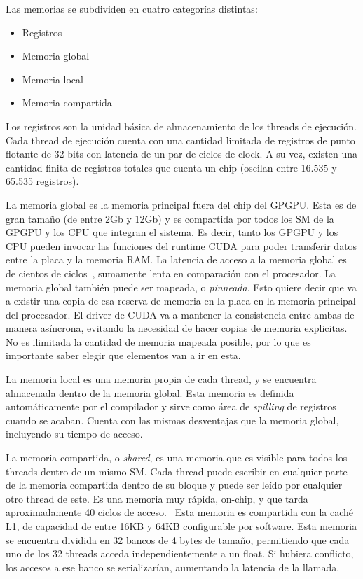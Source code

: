 Las memorias se subdividen en cuatro categor\'ias distintas:

\begin{itemize}
  \item Registros
  \item Memoria global
  \item Memoria local
  \item Memoria compartida
\end{itemize}

Los registros son la unidad b\'asica de almacenamiento de los threads de ejecuci\'on.
Cada thread de ejecuci\'on cuenta con una cantidad limitada de registros de punto flotante de
32 bits con latencia de un par de ciclos de clock. A su vez, existen una cantidad finita de
registros totales que cuenta un chip (oscilan entre 16.535 y 65.535 registros).

La memoria global es la memoria principal fuera del chip del GPGPU. Esta es de gran tama\~no (de
entre 2Gb y 12Gb) y es compartida por todos los SM de la GPGPU y los CPU que integran el
sistema. Es decir, tanto los GPGPU y los CPU pueden invocar las funciones del runtime CUDA
para poder transferir datos entre la placa y la memoria RAM. La latencia de acceso a la memoria global
es de cientos de ciclos~\cite{Demystifying}, sumamente lenta en comparaci\'on con el procesador.
La memoria global tambi\'en puede ser mapeada, o \textit{pinneada}. Esto quiere decir que va a existir
una copia de esa reserva de memoria en la placa en la memoria principal del procesador. El driver
de CUDA va a mantener la consistencia entre ambas de manera as\'incrona, evitando la necesidad de hacer
copias de memoria explicitas. No es ilimitada la cantidad de memoria mapeada posible, por lo que
es importante saber elegir que elementos van a ir en esta.

La memoria local es una memoria propia de cada thread, y se encuentra almacenada dentro de la
memoria global. Esta memoria es definida autom\'aticamente por el compilador y sirve como \'area de \textit{spilling}
de registros cuando se acaban. Cuenta con las mismas desventajas que la memoria global, incluyendo
su tiempo de acceso.

La memoria compartida, o \textit{shared}, es una memoria que es visible para todos los threads dentro
de un mismo SM. Cada thread puede escribir en cualquier parte de la memoria compartida dentro de su bloque y
puede ser le\'ido por cualquier otro thread de este. Es una memoria muy r\'apida, on-chip, y
que tarda aproximadamente 40 ciclos de acceso.~\cite{Demystifying} Esta memoria es compartida con la cach\'e
L1, de capacidad de entre 16KB y 64KB configurable por software. Esta memoria se encuentra dividida
en 32 bancos de 4 bytes de tama\~no, permitiendo que cada uno de los 32 threads acceda independientemente
a un float. Si hubiera conflicto, los accesos a ese banco se serializar\'ian, aumentando la latencia
de la llamada.~\cite{farberCuda}

